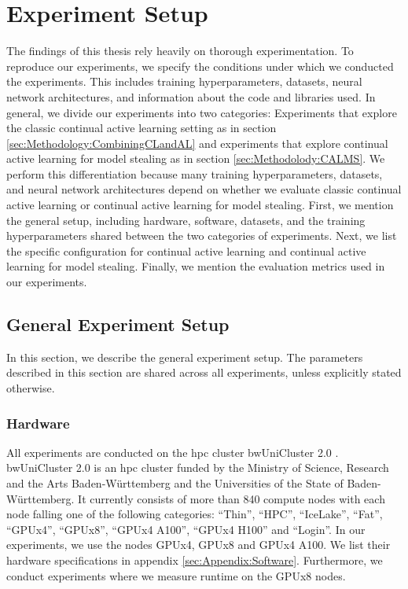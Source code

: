 
\chapter{Experiment Setup}
\label{ch:ExperimentSetup}
The findings of this thesis rely heavily on thorough experimentation. To reproduce our experiments, we specify the
conditions under which we conducted the experiments. This includes training hyperparameters, datasets, neural network architectures,
and information about the code and libraries used. In general, we divide our experiments into two categories: Experiments that explore
the classic continual active learning setting as in section \ref{sec:Methodology:CombiningCLandAL} and experiments that explore continual 
active learning for model stealing as in section \ref{sec:Methodolody:CALMS}. We perform this differentiation because many 
training hyperparameters, datasets, and neural network architectures depend on whether we evaluate classic continual active learning or continual 
active learning for model stealing. First, we mention the general setup, including hardware, software, datasets, and the training
hyperparameters shared between the two categories of experiments. Next, we list the specific configuration for
continual active learning and continual active learning for model stealing. Finally, we mention the evaluation metrics used in our experiments.

\section{General Experiment Setup}
\label{sec:ExperimentSetup:FirstSection}
In this section, we describe the general experiment setup. The parameters described in this section are shared across all experiments, unless
explicitly stated otherwise.

\subsection{Hardware}
All experiments are conducted on the \gls{hpc} cluster bwUniCluster 2.0 \cite{bwUnicluster}. bwUniCluster 2.0 is an \gls{hpc} cluster
funded by the Ministry of Science, Research and the Arts Baden-Württemberg and the Universities of the State of Baden-Württemberg. It currently consists
of more than 840 compute nodes with each node falling one of the following categories: \enquote{Thin}, \enquote{HPC}, \enquote{IceLake}, \enquote{Fat},
\enquote{GPUx4}, \enquote{GPUx8}, \enquote{GPUx4 A100}, \enquote{GPUx4 H100} and \enquote{Login}. In our experiments, we use the nodes GPUx4, GPUx8 and
GPUx4 A100. We list their hardware specifications in appendix \ref{sec:Appendix:Software}. Furthermore, we conduct experiments where we
measure runtime on the GPUx8 nodes.

